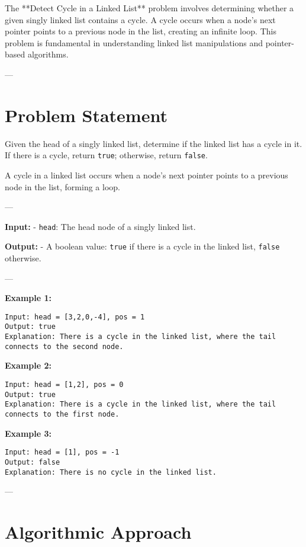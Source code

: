 
\label{problem:Detect_Cycle_in_Linked_List}

The **Detect Cycle in a Linked List** problem involves determining whether a given singly linked list contains a cycle. A cycle occurs when a node's next pointer points to a previous node in the list, creating an infinite loop. This problem is fundamental in understanding linked list manipulations and pointer-based algorithms.

---

\section*{Problem Statement}
Given the head of a singly linked list, determine if the linked list has a cycle in it. If there is a cycle, return \texttt{true}; otherwise, return \texttt{false}.

A cycle in a linked list occurs when a node's next pointer points to a previous node in the list, forming a loop.

---

\textbf{Input:}
- \texttt{head}: The head node of a singly linked list.

\textbf{Output:}
- A boolean value: \texttt{true} if there is a cycle in the linked list, \texttt{false} otherwise.

---

\textbf{Example 1:}
\begin{verbatim}
Input: head = [3,2,0,-4], pos = 1
Output: true
Explanation: There is a cycle in the linked list, where the tail connects to the second node.
\end{verbatim}

\textbf{Example 2:}
\begin{verbatim}
Input: head = [1,2], pos = 0
Output: true
Explanation: There is a cycle in the linked list, where the tail connects to the first node.
\end{verbatim}

\textbf{Example 3:}
\begin{verbatim}
Input: head = [1], pos = -1
Output: false
Explanation: There is no cycle in the linked list.
\end{verbatim}

---

\section*{Algorithmic Approach}


